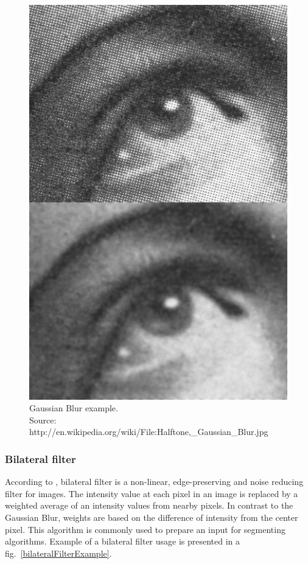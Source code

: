 \documentclass[a4paper,onecolumn,oneside,12pt]{memoir}
\begin{document}
\begin{figure}[ht]
\begin{center}
\includegraphics[scale=1.0]{images/GaussianBlurExample.jpg}
\caption{Gaussian Blur example. \\
Source: http://en.wikipedia.org/wiki/File:Halftone,\_Gaussian\_Blur.jpg}
\label{gaussianBlurExample}
\end{center}
\end{figure}

\subsubsection{Bilateral filter}

According to \cite{bilateralFilterWiki}, bilateral filter is a non-linear, edge-preserving and
noise reducing filter for images. The intensity value at each pixel in an image is replaced by a
weighted average of an intensity values from nearby pixels. In contrast to the Gaussian Blur, 
weights are based on the difference of intensity from the center pixel. This algorithm is commonly
used to prepare an input for segmenting algorithms. Example of a bilateral filter usage is presented
in a fig.~\ref{bilateralFilterExample}.
\end{document}
